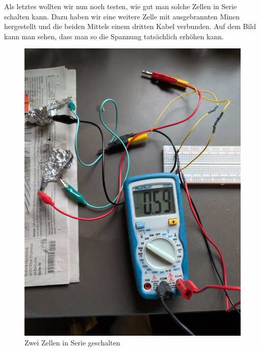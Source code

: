 \documentclass[ngerman, a4paper,12pt]{article}
\begin{document}
\noindent Als letztes wollten wir nun noch testen, wie gut man solche Zellen in Serie schalten kann. Dazu haben wir eine weitere Zelle mit ausgebrannten Minen hergestellt und die beiden Mittels einem dritten Kabel verbunden. Auf dem Bild kann man sehen, dass man so die Spannung tatsächlich erhöhen kann.
\begin{figure}[htbp]
	\centering
	\includegraphics[height=0.3\textheight]{Bild14.jpg}
	\caption{Zwei Zellen in Serie geschalten}\label{fig:bild14}
\end{figure}

\vspace{12px}
\end{document}
